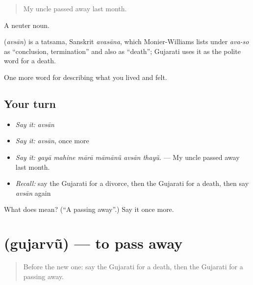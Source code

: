 \begin{quote}
My uncle passed away last month.
\end{quote}

A neuter noun.

\begin{cousinweb}
\textbf{} (\emph{avsān}) is a tatsama, Sanskrit \emph{avasāna}, which Monier-Williams lists under \emph{ava-so} as \textquotedblleft{}conclusion, termination\textquotedblright{} and also as \textquotedblleft{}death\textquotedblright{}; Gujarati uses it as the polite word for a death.
\end{cousinweb}

\begin{grammarlens}[title={What you've built}]
One more word for describing what you lived and felt.
\end{grammarlens}

\subsection*{Your turn}
\begin{itemize}
\raggedright
  \item \emph{Say it:} \emph{avsān}
  \item \emph{Say it:} \emph{avsān}, once more
  \item \emph{Say it:} \emph{gayā mahine mārā māmānũ avsān thayũ.} — My uncle passed away last month.
  \item \emph{Recall:} say the Gujarati for a divorce, then the Gujarati for a death, then say \emph{avsān} again
\end{itemize}

\begin{tcolorbox}[breakable,colback=teal!4,colframe=teal!35!black,title={Before you move on}]
What does  mean? (\textquotedblleft{}A passing away\textquotedblright{}.) Say it once more.
\end{tcolorbox}
\section[\texorpdfstring{\gu{ગુજરવું} (gujarvũ)}{ગુજરવું (gujarvũ)}]{ (gujarvũ) — to pass away}

\label{lesson:GU-C499-gujarvu}



\begin{quote}
Before the new one: say the Gujarati for a death, then the Gujarati for a passing away.
\end{quote}

